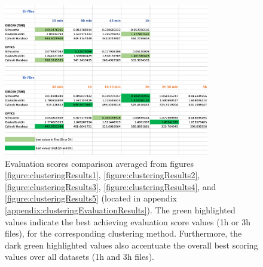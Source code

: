 \begin{figure}
  \centering
  \includegraphics[width=0.8\textwidth]{./images/clusteringResults/clusteringResults6.png}
  \caption{Evaluation scores comparison averaged from figures \ref{figure:clusteringResults1}, \ref{figure:clusteringResults2}, \ref{figure:clusteringResults3}, \ref{figure:clusteringResults4}, and \ref{figure:clusteringResults5} (located in appendix \ref{appendix:clusteringEvaluationResults}). The green highlighted values indicate the best achieving evaluation score values (1h or 3h files), for the corresponding clustering method. Furthermore, the dark green highlighted values also accentuate the overall best scoring values over all datasets (1h and 3h files).}
  \label{figure:clusteringResults6}
\end{figure}


